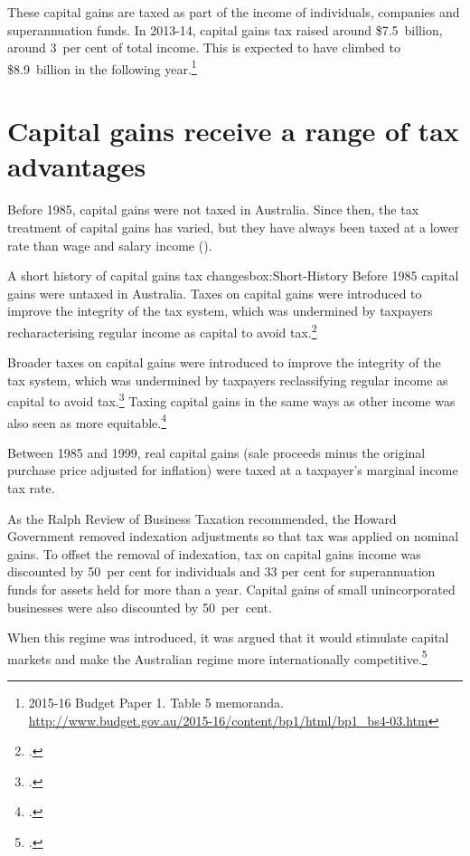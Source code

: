 These capital gains are taxed as part of the income of individuals, companies and superannuation funds. In 2013-14, capital gains tax raised around \$7.5~billion, around 3~per cent of total income. This is expected to have climbed to \$8.9~billion in the following year.\footnote{2015-16 Budget Paper 1. Table 5 memoranda. \url{http://www.budget.gov.au/2015-16/content/bp1/html/bp1_bs4-03.htm}}

\section{Capital gains receive a range of tax advantages}\label{sec:CG-receive-tax-advantages}
Before 1985, capital gains were not taxed in Australia. Since then, the tax treatment of capital gains has varied, but they have always been taxed at a lower rate than wage and salary income ().%
\enlargethispage{0.5\baselineskip}%

\begin{smallbox}{A short history of capital gains tax changes}{box:Short-History}
Before 1985 capital gains were untaxed in Australia. Taxes on capital gains were introduced to improve the integrity of the tax system, which was undermined by taxpayers recharacterising regular income as capital to avoid tax.\footcite{ReinhardtSteel2006}

Broader taxes on capital gains were introduced to improve the integrity of the tax system, which was undermined by taxpayers reclassifying regular income as capital to avoid tax.\footcites{Evans2005}{Kenny2005} Taxing capital gains in the same ways as other income was also seen as more equitable.\footcite{AustralianGovernment1985}

Between 1985 and 1999, real capital gains (sale proceeds minus the original purchase price adjusted for inflation) were taxed at a taxpayer’s marginal income tax rate. 

As the Ralph Review of Business Taxation recommended, the Howard Government removed indexation adjustments so that tax was applied on nominal gains. To offset the removal of indexation, tax on capital gains income was discounted by 50~per cent for individuals and 33 per cent for superannuation funds for assets held for more than a year. Capital gains of small unincorporated businesses were also discounted by 50~per~cent. 

When this regime was introduced, it was argued that it would stimulate capital markets and make the Australian regime more internationally competitive.\footcite[][14, 598]{RalphReview1999}
\end{smallbox}

